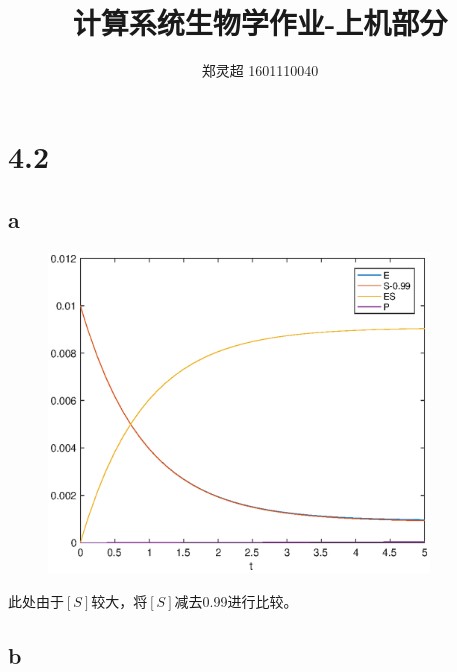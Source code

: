 \documentclass[a4paper,  11pt]{ctexart}
\begin{document}
\title{计算系统生物学作业-上机部分}
\author{郑灵超 1601110040}
\maketitle

\section*{4.2}
\subsection*{a}
\begin{figure}[H]
  \centering 
  \includegraphics[width=0.9\textwidth]{fig1.eps}
\end{figure}
此处由于$[S]$较大，将$[S]$减去0.99进行比较。
\subsection*{b}
\begin{figure}[H]
\end{figure}
\end{document}
